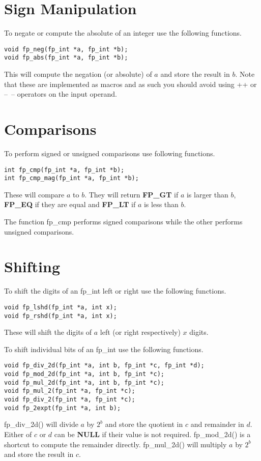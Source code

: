 \documentclass[b5paper]{book}
\begin{document}
\section{Sign Manipulation}
To negate or compute the absolute of an integer use the following functions.

 
\begin{verbatim}
void fp_neg(fp_int *a, fp_int *b);
void fp_abs(fp_int *a, fp_int *b);
\end{verbatim}
This will compute the negation (or absolute) of $a$ and store the result in $b$.  Note that these 
are implemented as macros and as such you should avoid using ++ or --~-- operators on the input 
operand.

\section{Comparisons}
To perform signed or unsigned comparisons use following functions.

 
\begin{verbatim}
int fp_cmp(fp_int *a, fp_int *b);
int fp_cmp_mag(fp_int *a, fp_int *b);
\end{verbatim}
These will compare $a$ to $b$.  They will return \textbf{FP\_GT} if $a$ is larger than $b$, 
\textbf{FP\_EQ} if they are equal and \textbf{FP\_LT} if $a$ is less than $b$.

The function fp\_cmp performs signed comparisons while the other performs unsigned comparisons.

\section{Shifting}
To shift the digits of an fp\_int left or right use the following functions.

 
\begin{verbatim}
void fp_lshd(fp_int *a, int x);
void fp_rshd(fp_int *a, int x);
\end{verbatim}

These will shift the digits of $a$ left (or right respectively) $x$ digits.  

To shift individual bits of an fp\_int use the following functions.

    
\begin{verbatim}
void fp_div_2d(fp_int *a, int b, fp_int *c, fp_int *d);
void fp_mod_2d(fp_int *a, int b, fp_int *c);
void fp_mul_2d(fp_int *a, int b, fp_int *c);
void fp_mul_2(fp_int *a, fp_int *c);
void fp_div_2(fp_int *a, fp_int *c);
void fp_2expt(fp_int *a, int b);
\end{verbatim}
fp\_div\_2d() will divide $a$ by $2^b$ and store the quotient in $c$ and remainder in $d$.  Either of 
$c$ or $d$ can be \textbf{NULL} if their value is not required.  fp\_mod\_2d() is a shortcut to 
compute the remainder directly.  fp\_mul\_2d() will multiply $a$ by $2^b$ and store the result in $c$.  
\end{document}
